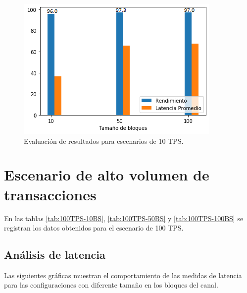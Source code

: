 \begin{figure}[h]
\centering
\includegraphics[scale=0.7]{Graphics/Resultado10TPS.png}
\caption{Evaluaci\'on de resultados para escenarios de 10 TPS.}
\label{Resultado10TPS}
\end{figure}

\newpage

\section{Escenario de alto volumen de transacciones}

En las tablas \ref{tab:100TPS-10BS}, \ref{tab:100TPS-50BS} y \ref{tab:100TPS-100BS} se registran los datos obtenidos para el escenario de 100 TPS.\\

\subsection{An\'alisis de latencia}

Las siguientes gr\'aficas muestran el comportamiento de las medidas de latencia para las configuraciones con diferente tama\~no en los bloques del canal.\\

